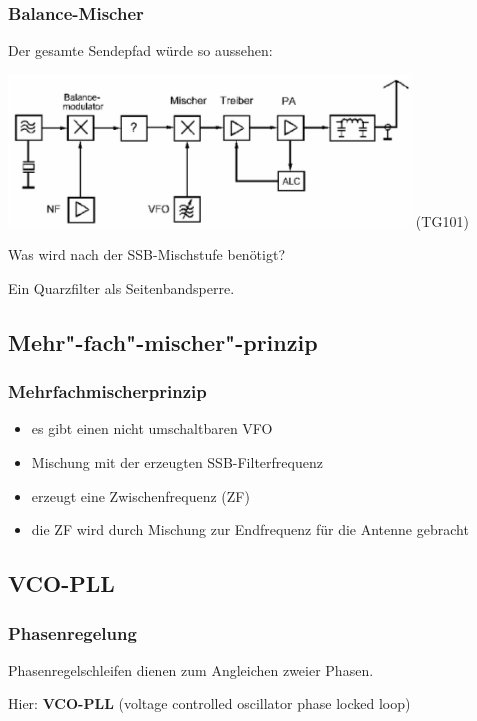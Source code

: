 \begin{frame}
    \frametitle{Balance-Mischer}

    Der gesamte Sendepfad würde so aussehen:

    \begin{center}
        \includegraphics[width=0.8\textwidth,height=.5\textheight,keepaspectratio]{a13/TG101.png}
	{\tiny (TG101)}
    \end{center}

    Was wird nach der SSB-Mischstufe benötigt?
    \vspace{2em}
    \pause

    Ein Quarzfilter als Seitenbandsperre.

\end{frame}

\subsection{Mehr"-fach"-mischer"-prinzip}
\begin{frame}
  \frametitle{Mehrfachmischerprinzip}
  \begin{itemize}
    \item es gibt einen nicht umschaltbaren VFO
    \item Mischung mit der erzeugten SSB-Filterfrequenz
    \item erzeugt eine Zwischenfrequenz (ZF)
    \item die ZF wird durch Mischung zur Endfrequenz für die Antenne gebracht
  \end{itemize}
\end{frame}

\subsection{VCO-PLL}

\begin{frame}
    \frametitle{Phasenregelung}

    Phasenregelschleifen dienen zum Angleichen zweier Phasen.

    \bigskip

    Hier: \textbf{VCO-PLL} (voltage controlled oscillator phase locked loop)

\end{frame}

